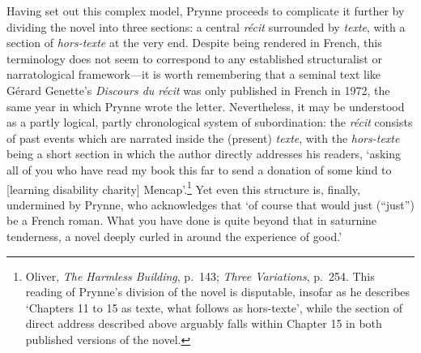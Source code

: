 \documentclass[]{article}
\begin{document}
Having set out this complex model, Prynne proceeds to complicate it
further by dividing the novel into three sections: a central
\emph{récit} surrounded by \emph{texte}, with a section of
\emph{hors-texte} at the very end. Despite being rendered in French,
this terminology does not seem to correspond to any established
structuralist or narratological framework—it is worth remembering that a
seminal text like Gérard Genette’s \emph{Discours du récit} was only
published in French in 1972, the same year in which Prynne wrote the
letter. Nevertheless, it may be understood as a partly logical, partly
chronological system of subordination: the \emph{récit} consists of past
events which are narrated inside the (present) \emph{texte}, with the
\emph{hors-texte} being a short section in which the author directly
addresses his readers, ‘asking all of you who have read my book this far
to send a donation of some kind to {[}learning disability charity{]}
Mencap’.\footnote{Oliver, \emph{The Harmless Building}, p.~143;
  \emph{Three Variations}, p.~254. This reading of Prynne’s division of
  the novel is disputable, insofar as he describes ‘Chapters 11 to 15 as
  texte, what follows as hors-texte’, while the section of direct
  address described above arguably falls within Chapter 15 in both
  published versions of the novel.} Yet even this structure is, finally,
undermined by Prynne, who acknowledges that ‘of course that would just
(“just”) be a French roman. What you have done is quite beyond that in
saturnine tenderness, a novel deeply curled in around the experience of
good.’
\end{document}
